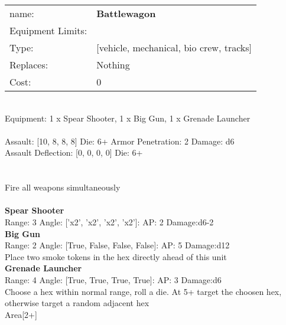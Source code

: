 \noindent
\begin{tabular}{ll}
name: &{\bf Battlewagon } \\
Equipment Limits: & \\
Type: &[vehicle, mechanical, bio crew, tracks] \\
Replaces: &Nothing \\
Cost: & 0\\
\end{tabular}
\ \\
Equipment: 1 x Spear Shooter, 1 x Big Gun, 1 x Grenade Launcher \\
\ \\
Assault: [10, 8, 8, 8] Die: 6+ Armor Penetration: 2 Damage: d6 \\
Assault Deflection: [0, 0, 0, 0] Die: 6+\\
\\ 
 
\ \\
Fire all weapons simultaneously\\ 

\ \\
{\bf Spear Shooter } \\



Range: 3  Angle: ['x2', 'x2', 'x2', 'x2']: AP: 2 Damage:d6-2 \\




{\bf Big Gun } \\



Range: 2  Angle: [True, False, False, False]: AP: 5 Damage:d12 \\
Place two smoke tokens in the hex directly ahead of this unit\\ 




{\bf Grenade Launcher } \\



Range: 4  Angle: [True, True, True, True]: AP: 3 Damage:d6 \\
Choose a hex within normal range, roll a die. At 5+ target the choosen hex, otherwise target a random adjacent hex\\ 
Area[2+]\\ 




 
\ \\



